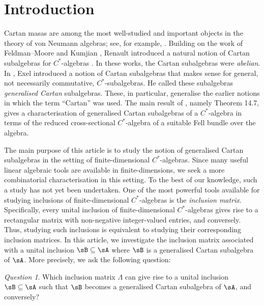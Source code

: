 \documentclass[12pt,a4paper]{amsart}
\theoremstyle{plain}
\theoremstyle{definition}
\theoremstyle{remark}
\numberwithin{equation}{section}
\theoremstyle{ser}
\theoremstyle{serr}
\theoremstyle{ser}
\theoremstyle{ser}
\newtheorem{qn}{Question}
\theoremstyle{collabquestion}
\newcommand{\<}{\langle}
\renewcommand{\>}{\rangle}
\begin{document}
    \section{Introduction}
Cartan masas are among the most well-studied and important objects in the theory of von Neumann algebras; see, for example, \cite{Dix1954}. Building on the work of Feldman--Moore \cite{Feldman_Moore} and Kumjian \cite{Kumjian_86}, Renault introduced a natural notion of Cartan subalgebras for $C^*$-algebras \cite{Renault2008CartanSI}. In these works, the Cartan subalgebras were \emph{abelian}. In \cite{Exel2011}, Exel introduced a notion of Cartan subalgebras that makes sense for general, not necessarily commutative, $C^*$-subalgebras. He called these subalgebras \emph{generalised Cartan} subalgebras. These, in particular, generalise the earlier notions in which the term ``Cartan'' was used. The main result of \cite{Exel2011}, namely Theorem 14.7, gives a characterisation of generalised Cartan subalgebras of a $C^*$-algebra in terms of the reduced cross-sectional $C^*$-algebra of a suitable Fell bundle over the algebra.

The main purpose of this article is to study the notion of generalised Cartan subalgebras in the setting of finite-dimensional $C^*$-algebras. Since many useful linear algebraic tools are available in finite-dimensions, we seek a more combinatorial characterisation in this setting. To the best of our knowledge, such a study has not yet been undertaken. One of the most powerful tools available for studying inclusions of finite-dimensional $C^*$-algebras is the \emph{inclusion matrix}. Specifically, every unital inclusion of finite-dimensional $C^*$-algebras gives rise to a rectangular matrix with non-negative integer-valued entries, and conversely. Thus, studying such inclusions is equivalent to studying their corresponding inclusion matrices. In this article, we investigate the inclusion matrix associated with a unital inclusion $\sB\subseteq \sA$ where $\sB$ is a generalised Cartan subalgebra of $\sA$. More precisely, we ask the following question:
\begin{qn}
Which inclusion matrix $\Lambda$ can give rise to a unital inclusion $\sB \subseteq \sA$ such that $\sB$ becomes a generalised Cartan subalgebra of $\sA$, and conversely?
\end{qn}
\end{document}

